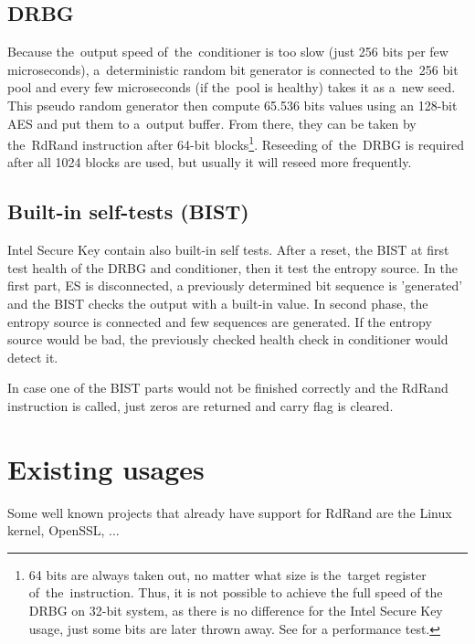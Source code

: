 \subsection{DRBG}\label{subsec:DRBG}
Because the~output speed of~the~conditioner is too slow (just 256 bits per few microseconds), a~deterministic random bit generator is connected to the~256 bit pool and every few microseconds (if the~pool is healthy) takes it as a~new seed. This pseudo random generator then compute 65.536 bits values using an 128-bit AES and put them to a~output buffer. From there, they can be taken by the~RdRand instruction after 64-bit blocks\footnote{64 bits are always taken out, no matter what size is the~target register of~the~instruction. Thus, it is not possible to achieve the full speed of the DRBG on 32-bit system, as there is no difference for the Intel Secure Key usage, just some bits are later thrown away. See  for a performance test.}\cite{AnalysisOfDRNG}\cite{UnderstandingRdRandElectronic}. Reseeding of~the~DRBG is required after all 1024 blocks are used, but usually it will reseed more frequently.

\subsection{Built-in self-tests (BIST)}
Intel Secure Key contain also built-in self tests. After a reset, the BIST at first test health of the DRBG and conditioner, then it test the entropy source. In the first part, ES is disconnected, a previously determined bit sequence is 'generated' and the BIST checks the output with a built-in value. In second phase, the entropy source is connected and few sequences are generated. If the entropy source would be bad, the previously checked health check in conditioner would detect it. 

In case one of the BIST parts would not be finished correctly and the RdRand instruction is called, just zeros are returned and carry flag is cleared\cite{AnalysisOfDRNG}.

\section{Existing usages} 
Some well known projects that already have support for RdRand are the Linux kernel, OpenSSL, ...


